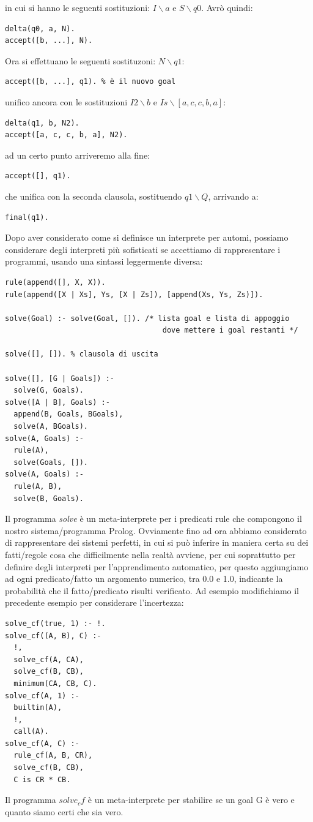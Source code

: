 in cui si hanno le seguenti sostituzioni: $I\backslash a$ e $S\backslash q0$.\newline
Avrò quindi:
\begin{verbatim}
delta(q0, a, N).
accept([b, ...], N).
\end{verbatim}
Ora si effettuano le seguenti sostituzoni: $N\backslash q1$:
\begin{verbatim}
accept([b, ...], q1). % è il nuovo goal
\end{verbatim}
unifico ancora con le sostituzioni $I2\backslash b$ e $Is\backslash [a,c,c,b,a]$:
\begin{verbatim}
delta(q1, b, N2).
accept([a, c, c, b, a], N2).
\end{verbatim}
ad un certo punto arriveremo alla fine:
\begin{verbatim}
accept([], q1).
\end{verbatim}
che unifica con la seconda clausola, sostituendo $q1\backslash Q$, arrivando a:
\begin{verbatim}
final(q1).
\end{verbatim}
Dopo aver considerato come si definisce un interprete per automi, possiamo considerare degli interpreti più sofisticati
se accettiamo di rappresentare i programmi, usando una sintassi leggermente diversa:
\begin{verbatim}
rule(append([], X, X)).
rule(append([X | Xs], Ys, [X | Zs]), [append(Xs, Ys, Zs)]).

solve(Goal) :- solve(Goal, []). /* lista goal e lista di appoggio
                                    dove mettere i goal restanti */

solve([], []). % clausola di uscita

solve([], [G | Goals]) :-
  solve(G, Goals).
solve([A | B], Goals) :-
  append(B, Goals, BGoals),
  solve(A, BGoals).
solve(A, Goals) :-
  rule(A),
  solve(Goals, []).
solve(A, Goals) :-
  rule(A, B),
  solve(B, Goals).
\end{verbatim}
Il programma \textit{solve} è un meta-interprete per i predicati rule che compongono il nostro sistema/programma Prolog.
Ovviamente fino ad ora abbiamo considerato di rappresentare dei sistemi perfetti, in cui si può inferire in maniera certa su dei fatti/regole
cosa che difficilmente nella realtà avviene, per cui soprattutto per definire degli interpreti per l'apprendimento automatico, per questo
aggiungiamo ad ogni predicato/fatto un argomento numerico, tra 0.0 e 1.0,
indicante la probabilità che il fatto/predicato risulti verificato.\newline
Ad esempio modifichiamo il precedente esempio per considerare l'incertezza:
\begin{verbatim}
solve_cf(true, 1) :- !.
solve_cf((A, B), C) :-
  !,
  solve_cf(A, CA),
  solve_cf(B, CB),
  minimum(CA, CB, C).
solve_cf(A, 1) :-
  builtin(A),
  !,
  call(A).
solve_cf(A, C) :-
  rule_cf(A, B, CR),
  solve_cf(B, CB),
  C is CR * CB.
\end{verbatim}
Il programma $solve_cf$ è un meta-interprete per stabilire se un goal G è vero e quanto siamo certi che sia vero.
